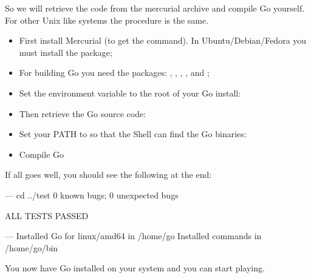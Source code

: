 So we will retrieve the code from the mercurial archive and compile
Go yourself. For other Unix like systems the procedure is the same.
\begin{itemize}
\item First install Mercurial (to get the  command). In
Ubuntu/Debian/Fedora you must install the  package;

\item For building Go you need the packages: ,
, , ,  and ;

\item Set the environment variable  to the root of your
Go install:
\begin{display}
\pr {}
\end{display}

\item Then retrieve the Go source code:
\begin{display}
\pr {}
\end{display}

\item Set your PATH to so that the Shell can find the Go binaries:
\begin{display}
\pr {}
\end{display}
\item Compile Go
\begin{display}
\pr {}
\pr {}
\end{display}
\end{itemize}
If all goes well, you should see the following at the end:
\begin{display}
--- cd ../test
0 known bugs; 0 unexpected bugs

ALL TESTS PASSED

---
Installed Go for linux/amd64 in /home/go
Installed commands in /home/go/bin
\end{display}
You now have Go installed on your system and you can start playing.

